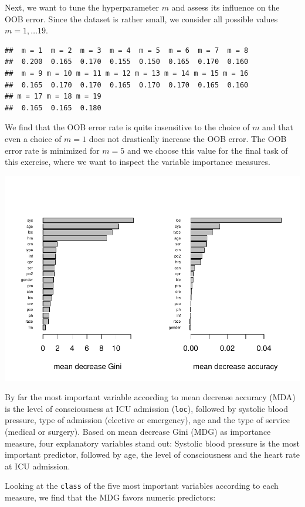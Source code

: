 \documentclass[
]{article}
\begin{document}
Next, we want to tune the hyperparameter \(m\) and assess its influence
on the OOB error. Since the dataset is rather small, we consider all
possible values \(m = 1,\ldots 19\).

\begin{verbatim}
##  m = 1  m = 2  m = 3  m = 4  m = 5  m = 6  m = 7  m = 8 
##  0.200  0.165  0.170  0.155  0.150  0.165  0.170  0.160 
##  m = 9 m = 10 m = 11 m = 12 m = 13 m = 14 m = 15 m = 16 
##  0.165  0.170  0.170  0.165  0.170  0.170  0.165  0.160 
## m = 17 m = 18 m = 19 
##  0.165  0.165  0.180
\end{verbatim}

We find that the OOB error rate is quite insensitive to the choice of
\(m\) and that even a choice of \(m=1\) does not drastically increase
the OOB error. The OOB error rate is minimized for \(m=5\) and we choose
this value for the final task of this exercise, where we want to inspect
the variable importance measures.

\includegraphics{A3_files/figure-latex/unnamed-chunk-21-1.pdf}

By far the most important variable according to mean decrease accuracy
(MDA) is the level of consciousness at ICU admission (\texttt{loc}),
followed by systolic blood pressure, type of admission (elective or
emergency), age and the type of service (medical or surgery). Based on
mean decrease Gini (MDG) as importance measure, four explanatory
variables stand out: Systolic blood pressure is the most important
predictor, followed by age, the level of consciousness and the heart
rate at ICU admission.

Looking at the \texttt{class} of the five most important variables
according to each measure, we find that the MDG favors numeric
predictors:
\end{document}
